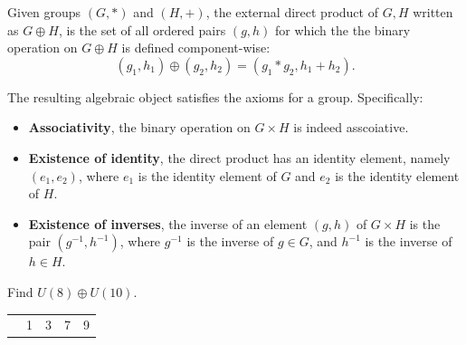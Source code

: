 \begin{definition}
    Given groups $(G, *)$ and $(H, +)$, the external direct product of 
    $G, H$ written as $G \oplus H$, is the set of all ordered pairs $(g,h)$ for which the 
    the binary operation on $G \oplus H$ is defined component-wise:
    \[
        (g_1, h_1) \oplus (g_2, h_2) = (g_1 * g_2, h_1 + h_2).
    \]
\end{definition}

The resulting algebraic object satisfies the axioms for a group. Specifically:

\begin{itemize}
    \item \textbf{Associativity}, the binary operation on $G \times H$ is indeed asscoiative.
    \item \textbf{Existence of identity}, the direct product has an identity element, namely $(e_1, e_2)$, where 
        $e_1$ is the identity element of $G$ and $e_2$ is the identity element of $H$.
    \item \textbf{Existence of inverses}, the inverse of an element $(g,h)$ of $G \times H$ is the pair $(g^{-1}, h^{-1})$, 
        where $g^{-1}$ is the inverse of $g \in G$, and $h^{-1}$ is the inverse of $h \in H$.
\end{itemize}

\begin{example}
    Find $U(8) \oplus U(10)$.
\end{example}
\begin{solution}
    \begin{center}
        \begin{tabular}{c|cccc}
            & 1 & 3 & 7 & 9\\
        \end{tabular}
    \end{center}
\end{solution}

